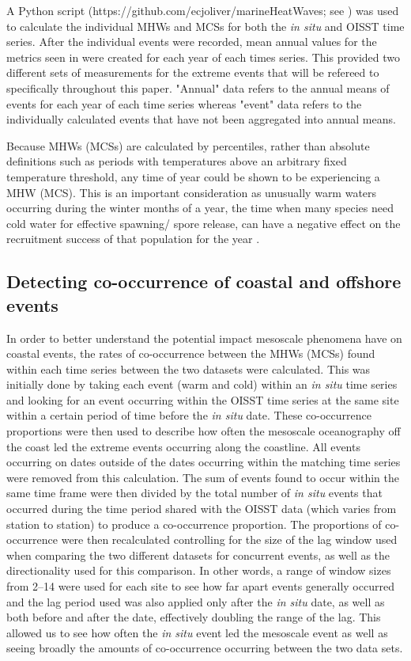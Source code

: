 \documentclass[a4paper,10pt,review]{elsarticle}
\begin{document}
A Python script (https://github.com/ecjoliver/marineHeatWaves; see \citet{Hobday2016}) was used to calculate the individual MHWs and MCSs for both the \emph{in situ} and OISST time series. After the individual events were recorded, mean annual values for the metrics seen in  were created for each year of each times series. This provided two different sets of measurements for the extreme events that will be refereed to specifically throughout this paper. "Annual" data refers to the annual means of events for each year of each time series whereas "event" data refers to the individually calculated events that have not been aggregated into annual means.

Because MHWs (MCSs) are calculated by percentiles, rather than absolute definitions such as periods with temperatures above an arbitrary fixed temperature threshold, any time of year could be shown to be experiencing a MHW (MCS). This is an important consideration as unusually warm waters occurring during the winter months of a year, the time when many species need cold water for effective spawning/ spore release, can have a negative effect on the recruitment success of that population for the year \citep{Wernberg2011}.

\subsection{Detecting co-occurrence of coastal and offshore events}
In order to better understand the potential impact mesoscale phenomena have on coastal events, the rates of co-occurrence between the MHWs (MCSs) found within each time series between the two datasets were calculated. This was initially done by taking each event (warm and cold) within an \emph{in situ} time series and looking for an event occurring within the OISST time series at the same site within a certain period of time before the \emph{in situ} date. These co-occurrence proportions were then used to describe how often the mesoscale oceanography off the coast led the extreme events occurring along the coastline. All events occurring on dates outside of the dates occurring within the matching time series were removed from this calculation. The sum of events found to occur within the same time frame were then divided by the total number of \emph{in situ} events that occurred during the time period shared with the OISST data (which varies from station to station) to produce a co-occurrence proportion. The proportions of co-occurrence were then recalculated controlling for the size of the lag window used when comparing the two different datasets for concurrent events, as well as the directionality used for this comparison. In other words, a range of window sizes from 2--14 were used for each site to see how far apart events generally occurred and the lag period used was also applied only after the \emph{in situ} date, as well as both before and after the date, effectively doubling the range of the lag. This allowed us to see how often the \emph{in situ} event led the mesoscale event as well as seeing broadly the amounts of co-occurrence occurring between the two data sets.
\end{document}
